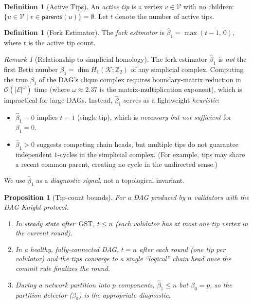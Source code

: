 \documentclass[11pt,a4paper]{article}
\newtheorem{proposition}[theorem]{Proposition}
\theoremstyle{definition}
\newtheorem{definition}[theorem]{Definition}
\theoremstyle{remark}
\newtheorem{remark}[theorem]{Remark}
\newcommand{\DK}{\textsf{DAG-Knight}}
\newcommand{\GST}{\mathrm{GST}}
\newcommand{\vertices}{\mathcal{V}}
\newcommand{\edges}{\mathcal{E}}
\newcommand{\bigO}{\mathcal{O}}
\begin{document}
\begin{definition}[Active Tips]\label{def:tips}
An \emph{active tip} is a vertex $v \in \vertices$ with no children:
$\{u \in \vertices \mid v \in \mathsf{parents}(u)\} = \emptyset$.
Let $t$ denote the number of active tips.
\end{definition}

\begin{definition}[Fork Estimator]\label{def:fork-estimator}
The \emph{fork estimator} is $\hat{\beta}_1 = \max(t - 1,\, 0)$,
where $t$ is the active tip count.
\end{definition}

\begin{remark}[Relationship to simplicial homology]\label{rem:not-homology}
The fork estimator $\hat{\beta}_1$ is \emph{not} the first Betti number
$\beta_1 = \dim H_1(\mathcal{K}; \mathbb{Z}_2)$ of any simplicial complex.
Computing the true $\beta_1$ of the DAG's clique complex requires
boundary-matrix reduction in $\bigO(|\edges|^{\omega})$ time
(where $\omega \approx 2.37$ is the matrix-multiplication exponent),
which is impractical for large DAGs.
Instead, $\hat{\beta}_1$ serves as a lightweight \emph{heuristic}:
\begin{itemize}[nosep]
  \item $\hat{\beta}_1 = 0$ implies $t = 1$ (single tip), which is
    \emph{necessary but not sufficient} for $\beta_1 = 0$.
  \item $\hat{\beta}_1 > 0$ suggests competing chain heads, but multiple
    tips do not guarantee independent $1$-cycles in the simplicial complex.
    (For example, tips may share a recent common parent, creating no cycle
    in the undirected sense.)
\end{itemize}
We use $\hat{\beta}_1$ as a \emph{diagnostic signal}, not a topological
invariant.
\end{remark}

\begin{proposition}[Tip-count bounds]\label{prop:tip-bounds}
For a DAG produced by $n$ validators with the \DK{} protocol:
\begin{enumerate}[label=(\roman*)]
  \item In steady state after~$\GST$, $t \leq n$ (each validator has at
    most one tip vertex in the current round).
  \item In a healthy, fully-connected DAG, $t = n$ after each round
    (one tip per validator) and the tips converge to a single ``logical''
    chain head once the commit rule finalizes the round.
  \item During a network partition into $p$ components,
    $\hat{\beta}_1 \leq n$ but $\beta_0 = p$, so the partition detector
    ($\beta_0$) is the appropriate diagnostic.
\end{enumerate}
\end{proposition}
\end{document}
